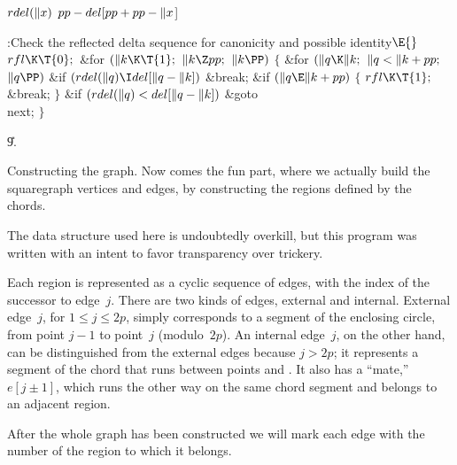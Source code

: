 \Y\B\4\D$\\{rdel}(\|x)$ \5
$\\{pp}-\\{del}[\\{pp}+\\{pp}-\|x{}$]\par
\Y\B\4:Check the reflected delta sequence for canonicity and possible
identity\X${}\E{}$\6
$\\{rfl}\K\T{0};{}$\6
\&{for} ${}(\|k\K\T{1};{}$ ${}\|k\Z\\{pp};{}$ ${}\|k\PP){}$\5
${}\{{}$\1\6
\&{for} ${}(\|q\K\|k;{}$ ${}\|q<\|k+\\{pp};{}$ ${}\|q\PP){}$\1\6
\&{if} ${}(\\{rdel}(\|q)\I\\{del}[\|q-\|k]){}$\1\5
\&{break};\2\2\6
\&{if} ${}(\|q\E\|k+\\{pp}){}$\5
${}\{{}$\1\6
${}\\{rfl}\K\T{1};{}$\6
\&{break};\6
\4${}\}{}$\2\6
\&{if} ${}(\\{rdel}(\|q)<\\{del}[\|q-\|k]){}$\1\5
\&{goto} \\{next};\2\6
\4${}\}{}$\2\par
\U9.\fi

Constructing the graph. Now comes the fun part,
where we actually
build the squaregraph vertices and edges, by constructing the regions
defined by the chords.

The data structure used here is undoubtedly overkill, but this program
was written with an intent to favor transparency over trickery.

Each region is represented as a cyclic sequence of edges, with
 the index of the successor to edge~$j$. There are two
kinds of edges, external and internal. External edge~$j$, for
$1\le j\le2p$, simply corresponds to a segment of the enclosing circle,
from point $j-1$ to point~$j$ (modulo~$2p$). An internal edge~$j$, on the
other hand, can be distinguished from the external edges because $j>2p$;
it represents a segment of the chord that runs between points 
and . It also has a ``mate,'' $e[j\pm1]$, which runs the
other way on the same chord segment and belongs to an adjacent region.

After the whole graph has been constructed we will mark each edge
with the number of the region to which it belongs.

